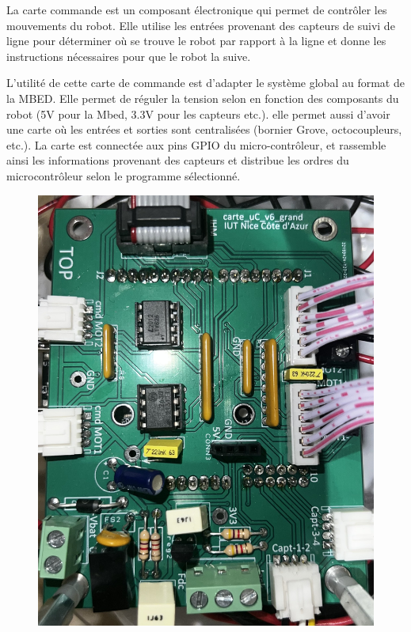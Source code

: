 La carte commande est un composant électronique qui permet de contrôler les mouvements du robot. Elle utilise les entrées provenant des capteurs de suivi de ligne pour déterminer où se trouve le robot par rapport à la ligne et donne les instructions nécessaires pour que le robot la suive.

L'utilité de cette carte de commande est d'adapter le système global au format de la MBED. Elle permet de réguler la tension selon en fonction des composants du robot (5V pour la Mbed, 3.3V pour les capteurs etc.). elle permet aussi d'avoir une carte où les entrées et sorties sont centralisées (bornier Grove, octocoupleurs, etc.).
La carte est connectée aux pins GPIO du micro-contrôleur, et rassemble ainsi les informations provenant des capteurs et distribue les ordres du microcontrôleur selon le programme sélectionné.


\begin{figure}[H]
\centering
\begin{minipage}{.5\textwidth}
  \centering
  \centerline{\includegraphics[width=1\linewidth, angle = 90]{img/cartes/commande.jpeg}}
  \label{fig:cmd}
\end{minipage}%
\end{figure}

